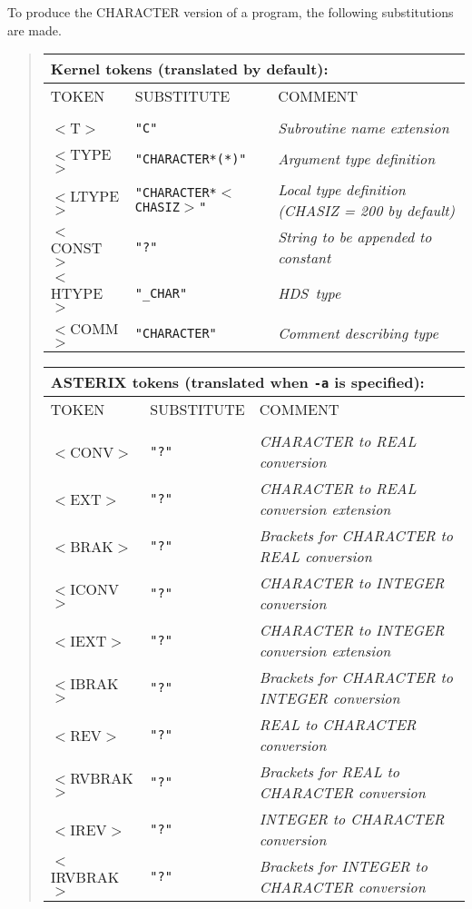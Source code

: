 \documentclass[twoside,11pt,nolof]{starlink}
\providecommand{\HDS}{{\footnotesize HDS}\normalsize}
\begin{document}
To produce the CHARACTER version of a program, the following
substitutions are made.
\begin{quote}
\begin{tabular}{lll}
\multicolumn{3}{l}{\bf{Kernel} tokens (translated by default):} \\
\hline
TOKEN      &SUBSTITUTE     & COMMENT \\
\\
$<$T$>$     &\texttt{"C"}             &\emph{Subroutine name extension} \\
$<$TYPE$>$  &\texttt{"CHARACTER*(*)"} &\emph{Argument type definition} \\
$<$LTYPE$>$ &\texttt{"CHARACTER*$<$CHASIZ$>$"} &\emph{Local type definition (CHASIZ = 200 by default)} \\
$<$CONST$>$ &\texttt{"?"}            &\emph{String to be appended to constant} \\
$<$HTYPE$>$ &\texttt{"\_CHAR"}       &\emph{\HDS\ type} \\
$<$COMM$>$  &\texttt{"CHARACTER"}    &\emph{Comment describing type} \\
\end{tabular}

\begin{tabular}{lll}
\multicolumn{3}{l}{\bf{ASTERIX} tokens (translated when \texttt{-a} is specified):} \\
\hline
TOKEN      &SUBSTITUTE     & COMMENT \\
\\
$<$CONV$>$  &\texttt{"?"} &\emph{CHARACTER to REAL conversion}\\
$<$EXT$>$   &\texttt{"?"} &\emph{CHARACTER to REAL conversion extension}\\
$<$BRAK$>$  &\texttt{"?"} &\emph{Brackets for CHARACTER to REAL conversion}\\
$<$ICONV$>$ &\texttt{"?"} &\emph{CHARACTER to INTEGER conversion}\\
$<$IEXT$>$  &\texttt{"?"} &\emph{CHARACTER to INTEGER conversion extension}\\
$<$IBRAK$>$ &\texttt{"?"} &\emph{Brackets for CHARACTER to INTEGER conversion} \\
$<$REV$>$   &\texttt{"?"} &\emph{REAL to CHARACTER conversion} \\
$<$RVBRAK$>$ &\texttt{"?"} &\emph{Brackets for REAL to CHARACTER conversion}\\
$<$IREV$>$  &\texttt{"?"} &\emph{INTEGER to CHARACTER conversion}\\
$<$IRVBRAK$>$ &\texttt{"?"} &\emph{Brackets for INTEGER to CHARACTER conversion} \\
\end{tabular}
\end{quote}
\end{document}
